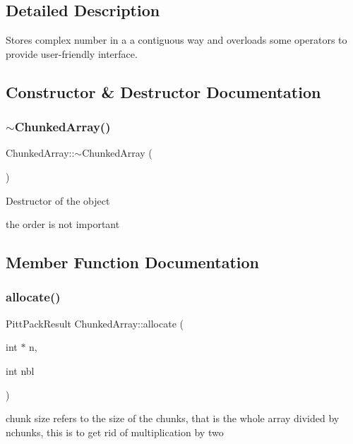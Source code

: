 \subsection{Detailed Description}
Stores complex number in a a contiguous way and overloads some operators to provide user-\/friendly interface. 

\subsection{Constructor \& Destructor Documentation}
\mbox{\label{classChunkedArray_a71913a12bb4934f6e01a594ff1e429fa}} 
\subsubsection{\texorpdfstring{$\sim$\+Chunked\+Array()}{~ChunkedArray()}}
{\footnotesize\ttfamily Chunked\+Array\+::$\sim$\+Chunked\+Array (\begin{DoxyParamCaption}{ }\end{DoxyParamCaption})}

Destructor of the object

the order is not important 

\subsection{Member Function Documentation}
\mbox{\label{classChunkedArray_a61a06ae961bb5d45fe6a7268fe276ac3}} 
\subsubsection{\texorpdfstring{allocate()}{allocate()}}
{\footnotesize\ttfamily Pitt\+Pack\+Result Chunked\+Array\+::allocate (\begin{DoxyParamCaption}\item[{int $\ast$}]{n,  }\item[{int}]{nbl }\end{DoxyParamCaption})}

chunk size refers to the size of the chunks, that is the whole array divided by nchunks, this is to get rid of multiplication by two \mbox{\label{classChunkedArray_aba54bf85d48b125c234e6a97867b9a84}} 
